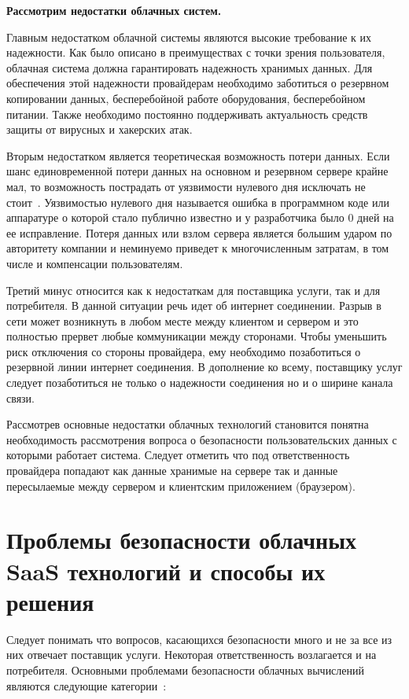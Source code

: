 \textbf{Рассмотрим недостатки облачных систем.}

Главным недостатком облачной системы являются высокие требование к их надежности. Как было описано в преимуществах с точки зрения пользователя, облачная система должна гарантировать надежность хранимых данных. Для обеспечения этой надежности провайдерам необходимо заботиться о резервном копировании данных, бесперебойной работе оборудования, бесперебойном питании. Также необходимо постоянно поддерживать актуальность средств защиты от вирусных и хакерских атак.

Вторым недостатком является теоретическая возможность потери данных. Если шанс единовременной потери данных на основном и резервном сервере крайне мал, то возможность пострадать от уязвимости нулевого дня исключать не стоит~\cite{amoroso2013enterprise}. Уязвимостью нулевого дня называется ошибка в программном коде или аппаратуре о которой стало публично известно и у разработчика было 0 дней на ее исправление. Потеря данных или взлом сервера является большим ударом по авторитету компании и неминуемо приведет к многочисленным затратам, в том числе и  компенсации пользователям.

Третий минус относится как к недостаткам для поставщика услуги, так и для потребителя. В данной ситуации речь идет об интернет соединении. Разрыв в сети может возникнуть в любом месте между клиентом и сервером и это полностью прервет любые коммуникации между сторонами. Чтобы уменьшить риск отключения со стороны провайдера, ему необходимо позаботиться о резервной линии интернет соединения. В дополнение ко всему, поставщику услуг следует позаботиться не только о надежности соединения но и о ширине канала связи.

Рассмотрев основные недостатки облачных технологий становится понятна необходимость рассмотрения вопроса о безопасности пользовательских данных с которыми работает система. Следует отметить что под ответственность провайдера попадают как данные хранимые на сервере так и данные пересылаемые между сервером и клиентским приложением (браузером).

\section{Проблемы безопасности облачных SaaS технологий и способы их решения}

Следует понимать что вопросов, касающихся безопасности много и не за все из них отвечает поставщик услуги. Некоторая ответственность возлагается и на потребителя.
Основными проблемами безопасности облачных вычислений являются следующие категории~\cite{khalil2014cloud}:

